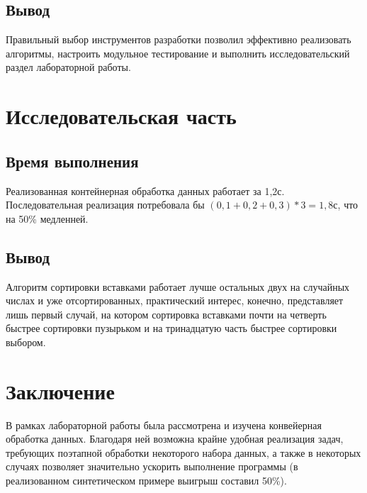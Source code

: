 \documentclass[a4paper,14pt]{extreport}
\begin{document}
\section*{Вывод}

Правильный выбор инструментов разработки позволил эффективно реализовать алгоритмы, настроить модульное тестирование и выполнить исследовательский раздел лабораторной работы.


\chapter{Исследовательская часть}

\section{Время выполнения}

Реализованная контейнерная обработка данных работает за 1,2с. Последовательная реализация потребовала бы $(0,1 + 0,2 + 0,3) * 3 = 1,8\text{с}$, что на 50\% медленней.

\section*{Вывод}

Алгоритм сортировки вставками работает лучше остальных двух на случайных числах и уже отсортированных, практический интерес, конечно, представляет лишь первый случай,
на котором сортировка вставками почти на четверть быстрее сортировки пузырьком и на тринадцатую часть быстрее сортировки выбором.


\chapter*{Заключение}

В рамках лабораторной работы была рассмотрена и изучена конвейерная обработка данных.
Благодаря ней возможна крайне удобная реализация задач, требующих поэтапной обработки некоторого набора данных, а также в некоторых случаях позволяет значительно ускорить выполнение программы (в реализованном синтетическом примере выигрыш составил 50\%).

\end{document}
